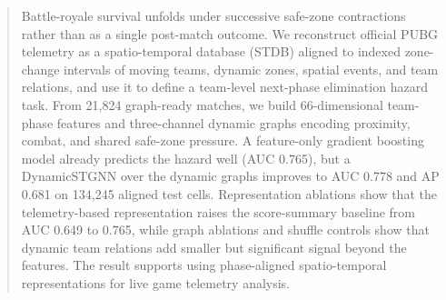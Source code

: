 \begin{abstract}
Battle-royale survival unfolds under successive safe-zone contractions rather
than as a single post-match outcome. We reconstruct official PUBG telemetry as
a spatio-temporal database (STDB) aligned to indexed zone-change intervals of
moving teams, dynamic zones, spatial events, and team relations, and use it to
define a team-level next-phase elimination hazard task. From 21,824
graph-ready matches, we build
66-dimensional team-phase features and three-channel dynamic graphs encoding
proximity, combat, and shared safe-zone pressure. A feature-only gradient
boosting model already predicts the hazard well (AUC 0.765), but a
DynamicSTGNN over the dynamic graphs improves to AUC 0.778 and AP 0.681 on
134,245 aligned test cells. Representation ablations show that the
telemetry-based representation raises the score-summary baseline from AUC
0.649 to 0.765, while graph ablations and shuffle controls show that
dynamic team relations add smaller but significant signal beyond the
features. The result supports using phase-aligned spatio-temporal
representations for live game telemetry analysis.
\end{abstract}
